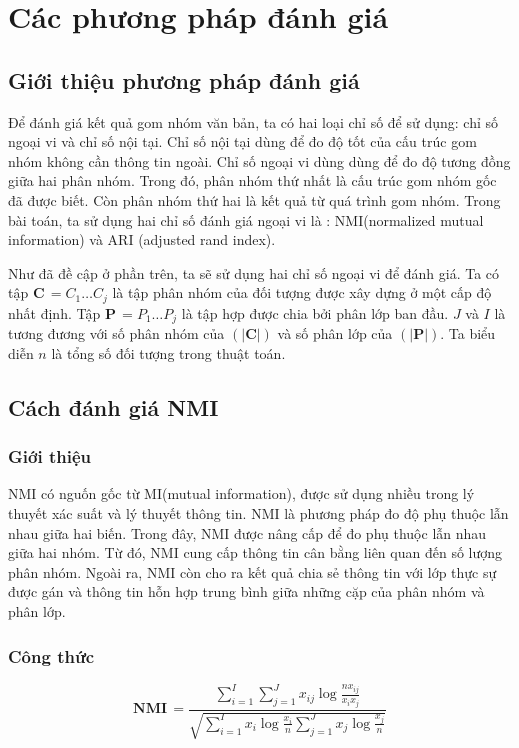 
\section{Các phương pháp đánh giá}

	\subsection{Giới thiệu phương pháp đánh giá}
	Để đánh giá kết quả gom nhóm văn bản, ta có hai loại chỉ số để sử dụng: chỉ số ngoại vi và chỉ số nội tại.
	Chỉ số nội tại dùng để đo độ tốt của cấu trúc gom nhóm không cần thông tin ngoài.
	Chỉ số ngoại vi dùng dùng để đo độ tương đồng giữa hai phân nhóm.
	Trong đó, phân nhóm thứ nhất là cấu trúc gom nhóm gốc đã được biết.
	Còn phân nhóm thứ hai là kết quả từ quá trình gom nhóm.
	Trong bài toán, ta sử dụng hai chỉ số đánh giá ngoại vi là : NMI(normalized mutual information) và ARI (adjusted rand index).
	
	Như đã đề cập ở phần trên, ta sẽ sử dụng hai chỉ số ngoại vi để đánh giá.
	Ta có tập $\textbf{C} \, = {C_1 \ldots C_j}$ là tập phân nhóm của đối tượng được xây dựng ở một cấp độ nhất định.
	Tập $\textbf{P} \, = {P_1 \ldots P_j}$ là tập hợp được chia bởi phân lớp ban đầu. $J$ và $I$ là tương đương với số phân nhóm của $(|\textbf{C}|)$ và số phân lớp của  $(|\textbf{P}|)$.
	Ta biểu diễn $n$ là tổng số đối tượng trong thuật toán.

	\subsection{Cách đánh giá NMI}
		\subsubsection{Giới thiệu}
		NMI có nguốn gốc từ MI(mutual information), được sử dụng nhiều trong lý thuyết xác suất và lý thuyết thông tin.
		NMI là phương pháp đo độ phụ thuộc lẫn nhau giữa hai biến.
		Trong đây, NMI được nâng cấp để đo phụ thuộc lẫn nhau giữa hai nhóm.
		Từ đó, NMI cung cấp thông tin cân bằng liên quan đến số lượng phân nhóm.
		Ngoài ra, NMI còn cho ra kết quả chia sẻ thông tin với lớp thực sự được gán và thông tin hỗn hợp trung bình giữa những cặp của phân nhóm và phân lớp.
		
		\subsubsection{Công thức}
		\begin{center}
		\begin{equation}
			\textbf{NMI} \, = \frac{\sum^I_{i=1} \sum^J_{j=1} x_{ij} \log \frac{n x_{ij}}{x_i x_j}}{\sqrt{\sum^I_{i=1} x_i \log \frac{x_i}{n} \sum^J_{j=1} x_j \log \frac{x_j}{n}}}
		\end{equation}
		\end{center}
		
